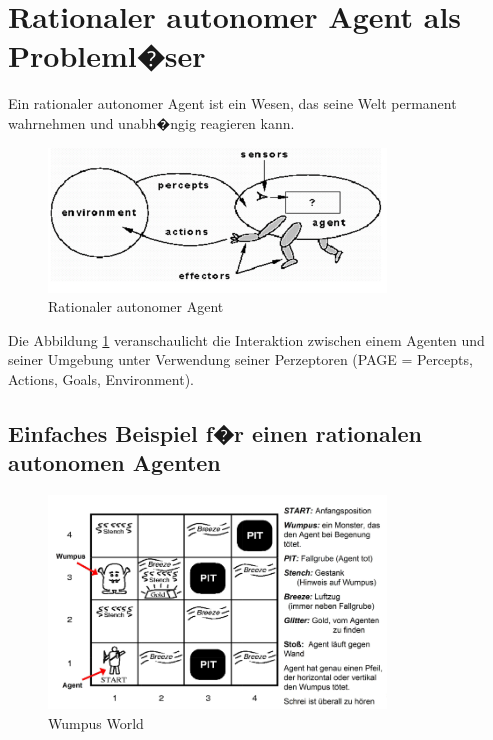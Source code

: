 \section{Rationaler autonomer Agent als Probleml�ser}

Ein rationaler autonomer Agent ist ein Wesen, das seine Welt permanent wahrnehmen und unabh�ngig reagieren kann.

\begin{figure}[H]
    \centering
    \includegraphics[width=0.8\textwidth]{figures/rational-agent.png}
    \caption{Rationaler autonomer Agent}
    \label{fig:rational-agent-diagram}
\end{figure}

Die Abbildung \ref{fig:rational-agent-diagram} veranschaulicht die Interaktion zwischen einem Agenten und seiner Umgebung unter Verwendung seiner Perzeptoren (PAGE = Percepts, Actions, Goals, Environment). 

\subsection{Einfaches Beispiel f�r einen rationalen autonomen Agenten}

\begin{figure}[H]
    \centering
    \includegraphics[width=0.8\textwidth]{figures/wumpus.png}
    \caption{Wumpus World}
    \label{fig:wumpus-example}
\end{figure}


